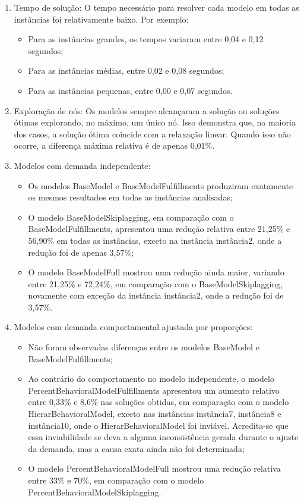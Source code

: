 \begin{enumerate}
    \item Tempo de solução:
    O tempo necessário para resolver cada modelo em todas as instâncias foi relativamente baixo. Por exemplo:
    \begin{itemize}
    \item Para as instâncias grandes, os tempos variaram entre 0,04 e 0,12 segundos;
    \item Para as instâncias médias, entre 0,02 e 0,08 segundos;
    \item Para as instâncias pequenas, entre 0,00 e 0,07 segundos.
    \end{itemize}

    \item Exploração de nós:
    Os modelos sempre alcançaram a solução ou soluções ótimas explorando, no máximo, um único nó. Isso demonstra que, na maioria dos casos, a solução ótima coincide com a relaxação linear. Quando isso não ocorre, a diferença máxima relativa é de apenas 0,01\%.
    
    \item Modelos com demanda independente:
    \begin{itemize}
        \item Os modelos BaseModel e BaseModelFulfillments produziram exatamente os mesmos resultados em todas as instâncias analisadas;
        \item O modelo BaseModelSkiplagging, em comparação com o BaseModelFulfillments, apresentou uma redução relativa entre 21,25\% e 56,90\% em todas as instâncias, exceto na instância instância2, onde a redução foi de apenas 3,57\%;
        \item O modelo BaseModelFull mostrou uma redução ainda maior, variando entre 21,25\% e 72,24\%, em comparação com o BaseModelSkiplagging, novamente com exceção da instância instância2, onde a redução foi de 3,57\%.
    \end{itemize}

    \item Modelos com demanda comportamental ajustada por proporções:
    \begin{itemize}
        \item Não foram observadas diferenças entre os modelos BaseModel e BaseModelFulfillments;
        \item Ao contrário do comportamento no modelo independente, o modelo PercentBehavioralModelFulfillments apresentou um aumento relativo entre 0,33\% e 8,6\% nas soluções obtidas, em comparação com o modelo HierarBehavioralModel, exceto nas instâncias instância7, instância8 e instância10, onde o HierarBehavioralModel foi inviável. Acredita-se que essa inviabilidade se deva a alguma inconsistência gerada durante o ajuste da demanda, mas a causa exata ainda não foi determinada;
        \item O modelo PercentBehavioralModelFull mostrou uma redução relativa entre 33\% e 70\%, em comparação com o modelo PercentBehavioralModelSkiplagging.
    \end{itemize}


\end{enumerate}
